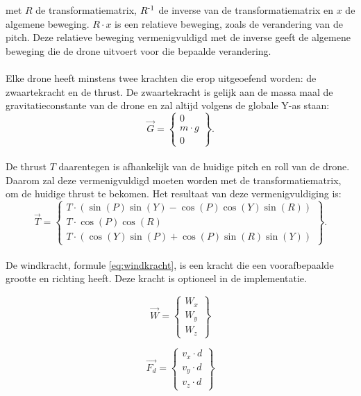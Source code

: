 met \(R\) de transformatiematrix, \(R\textsuperscript{-1}\) de inverse van de transformatiematrix en \(x\) de algemene beweging.  \(R \cdot x \)  is een relatieve beweging, zoals de verandering van de pitch. Deze relatieve beweging vermenigvuldigd met de inverse geeft de algemene beweging die de drone uitvoert voor die bepaalde verandering.
\\
\\
Elke drone heeft minstens twee krachten die erop uitgeoefend worden: de zwaartekracht en de thrust. De zwaartekracht is gelijk aan de massa maal de gravitatieconstante van de drone en zal altijd volgens de globale Y-as staan: \\
\begin{equation*} 
\vec{G} =
\begin{Bmatrix}
0 \\
m \cdot g \\
0 
\end{Bmatrix}.
\end{equation*} 
\\
De thrust \(T\) daarentegen is afhankelijk van de huidige pitch en roll van de drone. Daarom zal deze vermenigvuldigd moeten worden met de transformatiematrix, om de huidige thrust te bekomen. Het resultaat van deze vermenigvuldiging is: 
\begin{equation*} 
\vec{T} = 
\begin{Bmatrix}
T\cdot(\sin(P)\sin(Y) - \cos(P)\cos(Y)\sin(R))\\ 
T\cdot\cos(P)\cos(R) \\
T\cdot(\cos(Y)\sin(P) + \cos(P)\sin(R)\sin(Y))
\end{Bmatrix}.
\end{equation*}
\\
De windkracht, formule \ref{eq:windkracht}, is een kracht die een voorafbepaalde grootte en richting heeft. Deze kracht is optioneel in de implementatie. \\
\begin{figure}[h]
	\centering
	\begin{minipage}{.49\textwidth}
		\begin{equation}
		\vec{W} = 
		\begin{Bmatrix}
		W_x \\
		W_y \\
		W_z 
		\end{Bmatrix}
		\label{eq:windkracht}
		\end{equation}
	\end{minipage}
	\begin{minipage}{.49\textwidth}
		\begin{equation}
		\vec{F_d} = 
		\begin{Bmatrix}
		v_x \cdot d \\
		v_y \cdot d \\
		v_z \cdot d
		\end{Bmatrix}
		\label{eq:wrijvingskracht}
		\end{equation}
	\end{minipage}
\end{figure}
